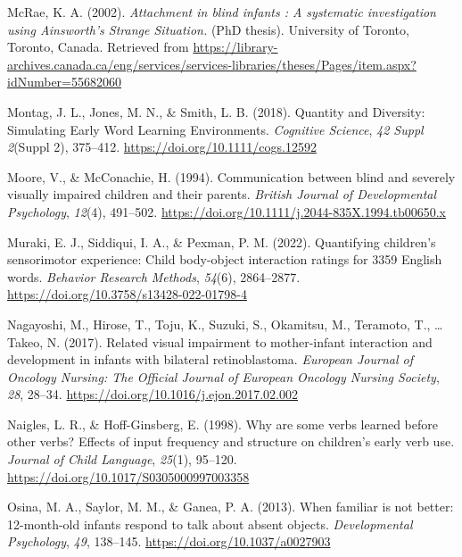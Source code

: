 \documentclass[
  man]{apa6}
\newlength{\cslhangindent}
\newlength{\cslentryspacingunit} %
\newenvironment{CSLReferences}[2] %
 {%
  \setlength{\parindent}{0pt}
  \ifodd #1
  \let\oldpar\par
  \def\par{\hangindent=\cslhangindent\oldpar}
  \fi
  \setlength{\parskip}{#2\cslentryspacingunit}
 }%
 {}
\begin{document}
\begin{CSLReferences}{1}{0}
\leavevmode{}%
McRae, K. A. (2002). \emph{Attachment in blind infants : A systematic investigation using {Ainsworth}'s {Strange} {Situation}.} (PhD thesis). University of Toronto, Toronto, Canada. Retrieved from \url{https://library-archives.canada.ca/eng/services/services-libraries/theses/Pages/item.aspx?idNumber=55682060}

\leavevmode{}%
Montag, J. L., Jones, M. N., \& Smith, L. B. (2018). Quantity and {Diversity}: {Simulating} {Early} {Word} {Learning} {Environments}. \emph{Cognitive Science}, \emph{42 Suppl 2}(Suppl 2), 375--412. \url{https://doi.org/10.1111/cogs.12592}

\leavevmode{}%
Moore, V., \& McConachie, H. (1994). Communication between blind and severely visually impaired children and their parents. \emph{British Journal of Developmental Psychology}, \emph{12}(4), 491--502. \url{https://doi.org/10.1111/j.2044-835X.1994.tb00650.x}

\leavevmode{}%
Muraki, E. J., Siddiqui, I. A., \& Pexman, P. M. (2022). Quantifying children's sensorimotor experience: {Child} body-object interaction ratings for 3359 {English} words. \emph{Behavior Research Methods}, \emph{54}(6), 2864--2877. \url{https://doi.org/10.3758/s13428-022-01798-4}

\leavevmode{}%
Nagayoshi, M., Hirose, T., Toju, K., Suzuki, S., Okamitsu, M., Teramoto, T., \ldots{} Takeo, N. (2017). Related visual impairment to mother-infant interaction and development in infants with bilateral retinoblastoma. \emph{European Journal of Oncology Nursing: The Official Journal of European Oncology Nursing Society}, \emph{28}, 28--34. \url{https://doi.org/10.1016/j.ejon.2017.02.002}

\leavevmode{}%
Naigles, L. R., \& Hoff-Ginsberg, E. (1998). Why are some verbs learned before other verbs? {Effects} of input frequency and structure on children's early verb use. \emph{Journal of Child Language}, \emph{25}(1), 95--120. \url{https://doi.org/10.1017/S0305000997003358}

\leavevmode{}%
Osina, M. A., Saylor, M. M., \& Ganea, P. A. (2013). When familiar is not better: 12-month-old infants respond to talk about absent objects. \emph{Developmental Psychology}, \emph{49}, 138--145. \url{https://doi.org/10.1037/a0027903}


\end{CSLReferences}
\end{document}
